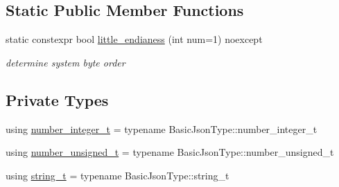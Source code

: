\subsection*{Static Public Member Functions}
\begin{DoxyCompactItemize}
\item 
static constexpr bool \hyperlink{classnlohmann_1_1detail_1_1binary__reader_a1d8f70f95d241354f86a0b9ae711c1c3}{little\+\_\+endianess} (int num=1) noexcept
\begin{DoxyCompactList}\small\item\em determine system byte order \end{DoxyCompactList}\end{DoxyCompactItemize}
\subsection*{Private Types}
\begin{DoxyCompactItemize}
\item 
using \hyperlink{classnlohmann_1_1detail_1_1binary__reader_ac6065302a10df2e78ed23a0e02e832bf}{number\+\_\+integer\+\_\+t} = typename Basic\+Json\+Type\+::number\+\_\+integer\+\_\+t
\item 
using \hyperlink{classnlohmann_1_1detail_1_1binary__reader_a6e87a28ccbfdb4afcc2c93df9f9dbe74}{number\+\_\+unsigned\+\_\+t} = typename Basic\+Json\+Type\+::number\+\_\+unsigned\+\_\+t
\item 
using \hyperlink{classnlohmann_1_1detail_1_1binary__reader_a889a8702ca8aa45e99136bc31ea898e9}{string\+\_\+t} = typename Basic\+Json\+Type\+::string\+\_\+t
\end{DoxyCompactItemize}
